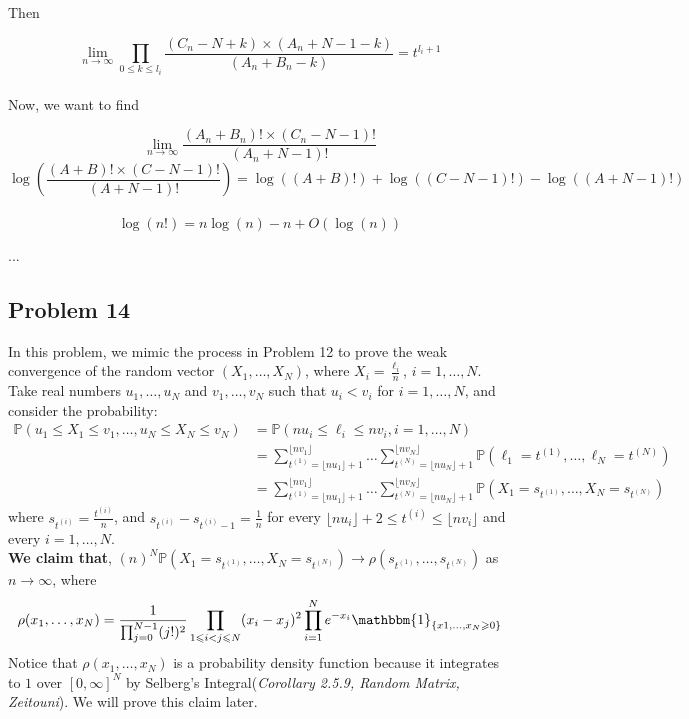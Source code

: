\documentclass[12pt]{article}
\begin{document}
Then

$$\lim_{n \rightarrow \infty} \prod_{0 \leq k \leq l_i} \frac{(C_n - N + k)\times (A_n+N-1-k)}{(A_n + B_n - k)} = t^{l_i + 1} $$\\

Now, we want to find

$$\lim_{n \rightarrow \infty} \frac{(A_n+ B_n)! \times (C_n-N - 1)!}{(A_n + N- 1)!}$$
$$\log \left( \frac{(A+B)! \times (C - N - 1)!}{(A + N - 1)!}\right) 
= \log((A+B)!) + \log((C-N-1)!) - \log(( A + N - 1)!)$$ \\

$$\log(n!) = n\log(n) - n + O(\log(n))$$

...

\subsection*{Problem 14}
In this problem, we mimic the process in Problem 12 to prove the weak convergence of the random vector $(X_{1},\dots,X_{N})$, where $X_{i}=\frac{\ell_{i}}{n}$, $i=1,\dots,N$. Take real numbers $u_{1},\dots, u_{N}$ and $v_{1},\dots, v_{N}$ such that $u_{i}<v_{i}$ for $i=1,\dots, N$, and consider the probability: 
\begin{align*}
\mathbb{P}(u_{1}\leqslant X_{1} \leqslant v_{1}, \dots,  u_{N}\leqslant X_{N} \leqslant v_{N})&=\mathbb{P}(nu_{i}\leqslant \ell_{i} \leqslant nv_{i}, i=1,\dots, N)	\\
&=\sum_{t^{(1)}=\lfloor nu_{1}\rfloor+1}^{\lfloor nv_{1}\rfloor}\dots \sum_{t^{(N)}=\lfloor nu_{N}\rfloor+1}^{\lfloor nv_{N}\rfloor}\mathbb{P}(\ell_{1}=t^{(1)},\dots,\ell_{N}=t^{(N)})\\
&=\sum_{t^{(1)}=\lfloor nu_{1}\rfloor+1}^{\lfloor nv_{1}\rfloor}\dots \sum_{t^{(N)}=\lfloor nu_{N}\rfloor+1}^{\lfloor nv_{N}\rfloor}\mathbb{P}(X_{1}=s_{t^{(1)}},\dots, X_{N}=s_{t^{(N)}})
\end{align*}
where $s_{t^{(i)}}=\frac{t^{(i)}}{n}$, and $s_{t^{(i)}}-s_{t^{(i)}-1}=\frac{1}{n}$ for every $\lfloor nu_{i}\rfloor +2\leqslant t^{(i)}\leqslant \lfloor nv_{i}\rfloor$ and every $i=1,\dots, N$.\\
\textbf{We claim that}, $(n)^{N}\mathbb{P}(X_{1}=s_{t^{(1)}},\dots,X_{N}=s_{t^{(N)}})\rightarrow \rho(s_{t^{(1)}},\dots, s_{t^{(N)}})$ as $n\rightarrow\infty$, where $$\rho(x_1,\dots, x_{N})=\frac{1}{\prod_{j=0}^{N-1}(j!)^{2}}\prod_{1\leqslant i<j\leqslant N}(x_{i}-x_{j})^2\prod_{i=1}^{N}e^{-x_{i}}\mathbbm{1}_{\{x1,\dots, x_{N}\geqslant 0\}}$$ 
Notice that $\rho(x_1,\dots, x_{N})$ is a probability density function because it integrates to $1$ over $[0,\infty]^{N}$ by Selberg's Integral(\emph{Corollary 2.5.9, Random Matrix, Zeitouni}). We will prove this claim later.\\
\end{document}
